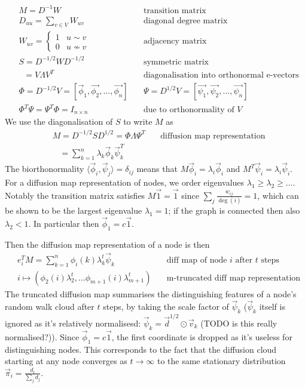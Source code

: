 \begin{align*}
  & M = D^{-1}W \quad & \text{transition matrix}\\
  & D_{uu} = \sum_{v\in V} W_{uv} \quad & \text{diagonal degree matrix}\\
  & W_{uv} = \begin{cases}1 & u \sim v \\0 & u \nsim v \end{cases} \quad & \text{adjacency matrix}
  \\
  & S = D^{-1/2} W D^{-1/2} \quad & \text{symmetric matrix}\\
  & \;\; = V \Lambda V^T \quad & \text{diagonalisation into orthonormal e-vectors}\\
  & \Phi = D^{-1/2} V = [\vec{\phi}_1, \vec{\phi_2}, ..., \vec{\phi_n}] \quad & \Psi = D^{1/2} V = [\vec{\psi_1}, \vec{\psi_2}, ..., \vec{\psi_n}]\\
  & \Phi^T \Psi = \Psi^T \Phi = I_{n \times n} \quad & \text{due to orthonormality of $V$}
\end{align*}
%
We use the diagonalisation of $S$ to write $M$ as 
\begin{align*}
  & M = D^{-1/2} S D^{1/2} = \Phi \Lambda \Psi^T \quad & \text{diffusion map representation}\\
  & \;\;\; = \sum_{k=1}^n \lambda_k \vec{\phi}_k \vec{\psi}_k^T &
\end{align*}
%
The biorthonormality $\langle \vec{\phi}_i, \vec{\psi}_j \rangle = \delta_{ij}$ means that $M \vec{\phi}_i = \lambda_i \vec{\phi}_i$ and $M^T \vec{\psi}_i = \lambda_i \vec{\psi}_i$. For a diffusion map representation of nodes, we order eigenvalues $\lambda_1 \geq \lambda_2 \geq ...$.
Notably the transition matrix satisfies $M\vec{1} = \vec{1}$ since $\sum_j \frac{w_{ij}}{\deg(i)} = 1$, which can be shown to be the largest eigenvalue $\lambda_1=1$; if the graph is connected then also $\lambda_2 < 1$. In particular then $\vec{\phi}_1 = c \vec{1}$.

Then the diffusion map representation of a node is then
\begin{align*}
  & e_i^T M = \sum_{k=1}^n \phi_i(k) \lambda_k^t \vec{\psi}_k \quad & \text{diff map of node $i$ after $t$ steps}\\
  & i \mapsto (\phi_2(i) \lambda_2^t,... \phi_{m+1}(i) \lambda_{m+1}^t) \quad & \text{m-truncated diff map representation}
\end{align*}
%
The truncated diffusion map summarises the distinguishing features of a node's random walk cloud after $t$ steps, by taking the scale factor of $\vec{\psi}_k$ ($\vec{\psi}_k$ itself is ignored as it's relatively normalisesd: $\vec{\psi}_k = \vec{d}^{1/2} \odot \vec{v}_k$ (TODO is this really normalised?)). Since $\vec{\phi}_1 = c \vec{1}$, the first coordinate is dropped as it's useless for distinguishing nodes. This corresponds to the fact that the diffusion cloud starting at any node converges as $t \to \infty$ to the same stationary distribution $\vec{\pi}_i = \frac{d_i}{\sum_j d_j}$.


